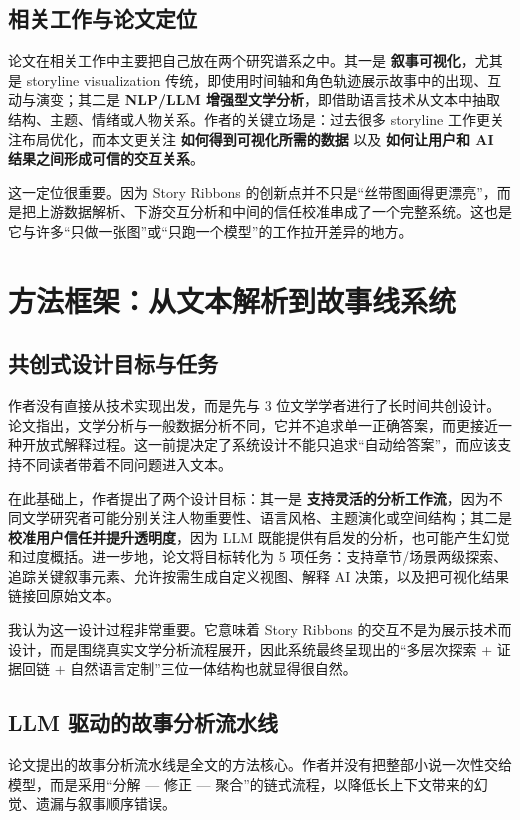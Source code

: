 \documentclass[a4paper,12pt,UTF8]{article}
\begin{document}
\subsection{相关工作与论文定位}
论文在相关工作中主要把自己放在两个研究谱系之中。其一是 \textbf{叙事可视化}，尤其是 storyline visualization 传统，即使用时间轴和角色轨迹展示故事中的出现、互动与演变；其二是 \textbf{NLP/LLM 增强型文学分析}，即借助语言技术从文本中抽取结构、主题、情绪或人物关系。作者的关键立场是：过去很多 storyline 工作更关注布局优化，而本文更关注 \textbf{如何得到可视化所需的数据} 以及 \textbf{如何让用户和 AI 结果之间形成可信的交互关系}。

这一定位很重要。因为 Story Ribbons 的创新点并不只是“丝带图画得更漂亮”，而是把上游数据解析、下游交互分析和中间的信任校准串成了一个完整系统。这也是它与许多“只做一张图”或“只跑一个模型”的工作拉开差异的地方。

\section{方法框架：从文本解析到故事线系统}

\subsection{共创式设计目标与任务}
作者没有直接从技术实现出发，而是先与 3 位文学学者进行了长时间共创设计。论文指出，文学分析与一般数据分析不同，它并不追求单一正确答案，而更接近一种开放式解释过程。这一前提决定了系统设计不能只追求“自动给答案”，而应该支持不同读者带着不同问题进入文本。

在此基础上，作者提出了两个设计目标：其一是 \textbf{支持灵活的分析工作流}，因为不同文学研究者可能分别关注人物重要性、语言风格、主题演化或空间结构；其二是 \textbf{校准用户信任并提升透明度}，因为 LLM 既能提供有启发的分析，也可能产生幻觉和过度概括。进一步地，论文将目标转化为 5 项任务：支持章节/场景两级探索、追踪关键叙事元素、允许按需生成自定义视图、解释 AI 决策，以及把可视化结果链接回原始文本。

我认为这一设计过程非常重要。它意味着 Story Ribbons 的交互不是为展示技术而设计，而是围绕真实文学分析流程展开，因此系统最终呈现出的“多层次探索 + 证据回链 + 自然语言定制”三位一体结构也就显得很自然。

\subsection{LLM 驱动的故事分析流水线}
论文提出的故事分析流水线是全文的方法核心。作者并没有把整部小说一次性交给模型，而是采用“分解 --- 修正 --- 聚合”的链式流程，以降低长上下文带来的幻觉、遗漏与叙事顺序错误。
\end{document}
